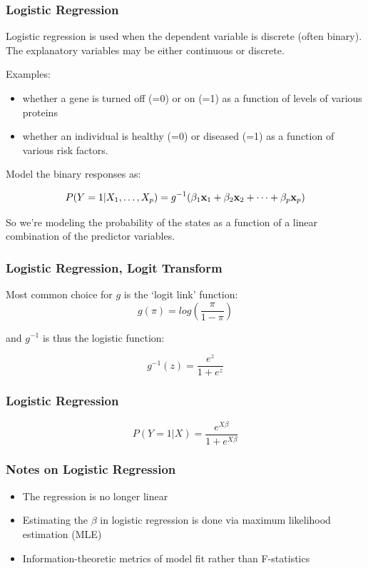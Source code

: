 \documentclass{beamer}
\begin{document}
\begin{frame}
  \frametitle{Logistic Regression}
  
Logistic regression is used when the dependent variable is discrete (often binary).  The explanatory variables may be either continuous or discrete.
\medskip

Examples:
\begin{itemize}
\item whether a gene is turned off (=0) or on (=1) as a function of levels of various proteins
\item whether an individual is healthy (=0) or diseased (=1) as a function of various risk factors.
\end{itemize}

Model the binary responses as:

\[P(Y = 1|X_1,\ldots,X_p) = g^{-1}(\beta_1\mathbf{x}_1 + \beta_2\mathbf{x}_2 + \cdots + \beta_p\mathbf{x}_p)
\]

So we're modeling the probability of the states as a function of a linear combination of the predictor variables.

\end{frame}

\begin{frame}
  \frametitle{Logistic Regression, Logit Transform}

Most common choice for $g$ is the `logit link' function:
\[
g(\pi) = log\left( \frac{\pi}{1-\pi} \right) 
\]

and $g^{-1}$ is thus the logistic function:

\[
g^{-1}(z) = \frac{e^z}{1+e^z}
\]

\end{frame}

\begin{frame}
  \frametitle{Logistic Regression}

\[
P(Y = 1 | X) = \frac{e^{X\beta}}{1+e^{X\beta}}
\]

\bigskip

\begin{center}
\end{center}

\end{frame}

\begin{frame}
  \frametitle{Notes on Logistic Regression}

\begin{itemize}
    \item The regression is no longer linear
    \item Estimating the $\beta$ in logistic regression is done via maximum likelihood estimation (MLE)
    \item Information-theoretic metrics of model fit rather than F-statistics
\end{itemize}

\end{frame}
\end{document}

